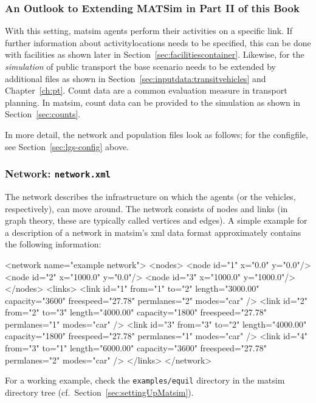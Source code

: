 \subsubsection{An Outlook to Extending MATSim in Part II of this Book}
With this setting, \gls{matsim} agents perform their activities on a specific \gls{link}. If further information about \glspl{activitylocation} needs to be specified, this can be done with facilities as shown later in Section~\ref{sec:facilitiescontainer}. Likewise, for the \emph{simulation} of public transport the base scenario needs to be extended by additional files as shown in Section~\ref{sec:inputdata:transitvehicles} and Chapter~\ref{ch:pt}. Count data are a common evaluation measure in transport planning. In \gls{matsim}, count data can be provided to the simulation as shown in Section~\ref{sec:counts}.
 
In more detail, the network and population files look as follows; for the \gls{configfile}, see Section~\ref{sec:lgs-config} above.

\makeatletter
\newcommand\thefontsize{{The current font size is: \f@size pt\par}}
\makeatother

\subsubsection{Network: \lstinline{network.xml}}
\label{sec:lgstarted-network}
The network describes the infrastructure on which the agents (or the vehicles, respectively), can move around. The network consists of \glspl{node} and \glspl{link} (in graph theory, these are typically called vertices and edges). A simple example for a description of a network in \gls{matsim}'s \gls{xml} data format 
approximately contains the following information:
\begin{xml}
<network name="example network"> 
   <nodes> 
      <node id="1" x="0.0" y="0.0"/> 
      <node id="2" x="1000.0" y="0.0"/> 
      <node id="3" x="1000.0" y="1000.0"/> 
   </nodes> 
   <links> 
      <link id="1" from="1" to="2" length="3000.00" capacity="3600" 
            freespeed="27.78" permlanes="2" modes="car" /> 
      <link id="2" from="2" to="3" length="4000.00" capacity="1800" 
            freespeed="27.78" permlanes="1" modes="car" /> 
      <link id="3" from="3" to="2" length="4000.00" capacity="1800" 
            freespeed="27.78" permlanes="1" modes="car" /> 
      <link id="4" from="3" to="1" length="6000.00" capacity="3600" 
            freespeed="27.78" permlanes="2" modes="car" /> 
   </links> 
</network>
\end{xml}
For a working example, check the \lstinline{examples/equil} directory in the \gls{matsim} directory tree (cf.\ Section~\ref{sec:settingUpMatsim}).

